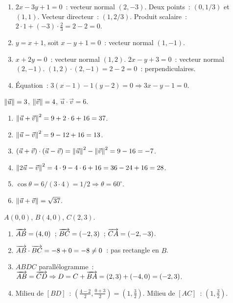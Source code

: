 
\begin{enumerate}
  \item $2x-3y+1=0$~: vecteur normal $(2,-3)$.
        Deux points~: $(0,1/3)$ et $(1,1)$. Vecteur directeur~: $(1,2/3)$.
        Produit scalaire~: $2\cdot1+(-3)\cdot\frac{2}{3}=2-2=0$.\checkmark
  \item $y=x+1$, soit $x-y+1=0$~: vecteur normal $(1,-1)$.
  \item $x+2y=0$~: vecteur normal $(1,2)$.
        $2x-y+3=0$~: vecteur normal $(2,-1)$.
        $(1,2)\cdot(2,-1)=2-2=0$~: perpendiculaires.\checkmark
  \item \'Equation~: $3(x-1)-1(y-2)=0\Rightarrow3x-y-1=0$.
\end{enumerate}


$\left\|\vec{u}\right\|=3$, $\left\|\vec{v}\right\|=4$, $\vec{u}\cdot\vec{v}=6$.
\begin{enumerate}
  \item $\left\|\vec{u}+\vec{v}\right\|^2=9+2\cdot6+16=37$.
  \item $\left\|\vec{u}-\vec{v}\right\|^2=9-12+16=13$.
  \item $(\vec{u}+\vec{v})\cdot(\vec{u}-\vec{v})=\left\|\vec{u}\right\|^2-\left\|\vec{v}\right\|^2=9-16=-7$.
  \item $\left\|2\vec{u}-\vec{v}\right\|^2=4\cdot9-4\cdot6+16=36-24+16=28$.
  \item $\cos\theta=6/(3\cdot4)=1/2\Rightarrow\theta=60^{\circ}$.
  \item $\left\|\vec{u}+\vec{v}\right\|=\sqrt{37}$.
\end{enumerate}


$A(0,0)$, $B(4,0)$, $C(2,3)$.
\begin{enumerate}
  \item $\overrightarrow{AB}=(4,0)$~; $\overrightarrow{BC}=(-2,3)$~; $\overrightarrow{CA}=(-2,-3)$.
  \item $\overrightarrow{AB}\cdot\overrightarrow{BC}=-8+0=-8\ne0$~: pas rectangle en $B$.
  \item $ABDC$ parall\'elogramme~: $\overrightarrow{AB}=\overrightarrow{CD}\Rightarrow D=C+\overrightarrow{BA}=(2,3)+(-4,0)=(-2,3)$.
  \item Milieu de $[BD]$~: $(\frac{4-2}{2},\frac{0+3}{2})=(1,\frac{3}{2})$.
        Milieu de $[AC]$~: $(1,\frac{3}{2})$.\checkmark
\end{enumerate}

